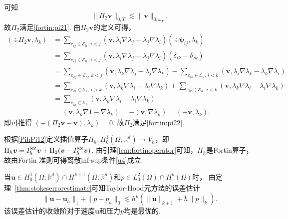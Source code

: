 \begin{prf}
\begin{equation*}
\end{equation*}
可知
\begin{equation*}
\|\Pi_{2}\boldsymbol{v}\|_{0,T}\lesssim  \|\boldsymbol{v}\|_{0,\omega_T}.
\end{equation*}
故$\Pi_2$满足\eqref{fortin:pi21}.
由$\Pi_{2}\boldsymbol{v}$的定义可得，
\begin{align*}
(\div\Pi_{2}\boldsymbol{v},\lambda_{k})
&=\sum_{e_{ij}\in\mathcal{E}_{h},\,i<j}(\boldsymbol{v},\lambda_{i}\nabla\lambda_{j}-\lambda_{j}\nabla\lambda_{i})(\div\boldsymbol{\psi}_{ij},\lambda_{k}) \\
&=\sum_{e_{ij}\in \mathcal{E}_{h},\,i<j}(\boldsymbol{v},\lambda_{i}\nabla\lambda_{j}-\lambda_{j}\nabla\lambda_{i})(\delta_{ik}-\delta_{jk}) \\
&=\sum_{e_{kj}\in \mathcal{E}_{h},\,k<j}(\boldsymbol{v},\lambda_{k}\nabla\lambda_{j}-\lambda_{j}\nabla\lambda_{k}) -\sum_{e_{ik}\in \mathcal{E}_{h},\,i<k}(\boldsymbol{v},\lambda_{i}\nabla\lambda_{k}-\lambda_{k}\nabla\lambda_{i}) \\
&=\sum_{e_{ki}\in \mathcal{E}_{h},\,i>k}(\boldsymbol{v},\lambda_{k}\nabla\lambda_{i}-\lambda_{i}\nabla\lambda_{k}) + \sum_{e_{ik}\in \mathcal{E}_{h},\,i<k}(\boldsymbol{v}, \lambda_{k}\nabla\lambda_{i}-\lambda_{i}\nabla\lambda_{k}) \\
&=\sum_{e_{ki}\in \mathcal{E}_{h}}(\boldsymbol{v},\lambda_{k}\nabla\lambda_{i}-\lambda_{i}\nabla\lambda_{k}) \\
&=(\boldsymbol{v},\lambda_{k}\nabla 1-\nabla\lambda_{k})=-(\boldsymbol{v},\nabla\lambda_{k})=(\div\boldsymbol{v},\lambda_{k}).
\end{align*}
即可推得
$(\div(\Pi_{2}\boldsymbol{v}-\boldsymbol{v}),\lambda_{k})=0$. 故$\Pi_2$满足\eqref{fortin:pi22}.

根据\eqref{PihPi12}定义插值算子$\Pi_{h}: H_0^{1}(\Omega; \mathbb{R}^{d})\rightarrow  V_{h}$，即
$\Pi_{h}\boldsymbol{v}=I_h^{\rm SZ}\boldsymbol{v}
+\Pi_{2}(\boldsymbol{v}-I_h^{\rm SZ}\boldsymbol{v})$. 由引理\ref{lem:fortinoperator}可知，$\Pi_{h}$是Fortin算子，故由Fortin 准则可得离散inf-sup条件\eqref{u4}成立.
\end{prf}


当$\boldsymbol{u}\in H_0^1(\Omega;\mathbb R^d)\cap H^{k+1}(\Omega;\mathbb R^d)$和$p\in L_0^2(\Omega)\cap H^{k}(\Omega)$时， 由定理~\ref{thm:stokeserrorestimate}可知Taylor-Hood元方法的误差估计
\begin{equation*}
\|\boldsymbol{u}-\boldsymbol{u}_h\|_{1} + \|p-p_h\|_{0}
\lesssim h^k(\|\boldsymbol{u}\|_{k+1}+h\|p\|_{k}).
\end{equation*}
该误差估计的收敛阶对于速度$\boldsymbol{u}$和压力$p$均是最优的.



